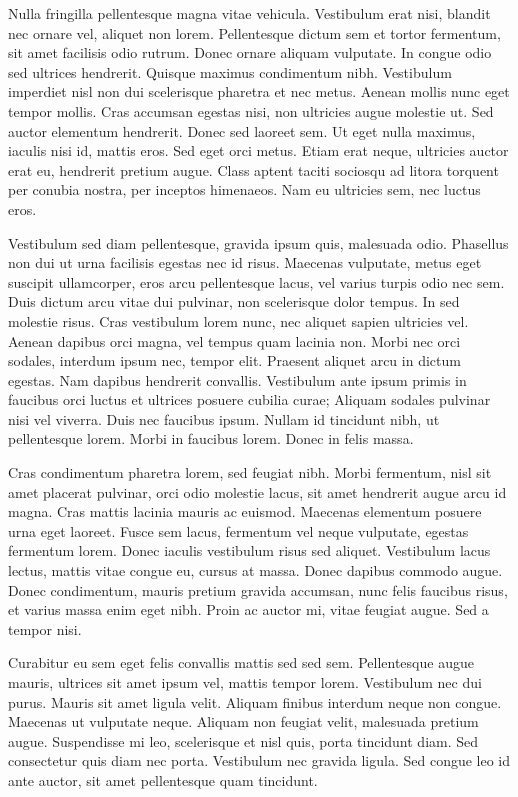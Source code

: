 \documentclass[11pt,twoside]{article}
\begin{document}
Nulla fringilla pellentesque magna vitae vehicula. Vestibulum erat nisi, blandit nec ornare vel, aliquet non lorem. Pellentesque dictum sem et tortor fermentum, sit amet facilisis odio rutrum. Donec ornare aliquam vulputate. In congue odio sed ultrices hendrerit. Quisque maximus condimentum nibh. Vestibulum imperdiet nisl non dui scelerisque pharetra et nec metus. Aenean mollis nunc eget tempor mollis. Cras accumsan egestas nisi, non ultricies augue molestie ut. Sed auctor elementum hendrerit. Donec sed laoreet sem. Ut eget nulla maximus, iaculis nisi id, mattis eros. Sed eget orci metus. Etiam erat neque, ultricies auctor erat eu, hendrerit pretium augue. Class aptent taciti sociosqu ad litora torquent per conubia nostra, per inceptos himenaeos. Nam eu ultricies sem, nec luctus eros.

Vestibulum sed diam pellentesque, gravida ipsum quis, malesuada odio. Phasellus non dui ut urna facilisis egestas nec id risus. Maecenas vulputate, metus eget suscipit ullamcorper, eros arcu pellentesque lacus, vel varius turpis odio nec sem. Duis dictum arcu vitae dui pulvinar, non scelerisque dolor tempus. In sed molestie risus. Cras vestibulum lorem nunc, nec aliquet sapien ultricies vel. Aenean dapibus orci magna, vel tempus quam lacinia non. Morbi nec orci sodales, interdum ipsum nec, tempor elit. Praesent aliquet arcu in dictum egestas. Nam dapibus hendrerit convallis. Vestibulum ante ipsum primis in faucibus orci luctus et ultrices posuere cubilia curae; Aliquam sodales pulvinar nisi vel viverra. Duis nec faucibus ipsum. Nullam id tincidunt nibh, ut pellentesque lorem. Morbi in faucibus lorem. Donec in felis massa.

Cras condimentum pharetra lorem, sed feugiat nibh. Morbi fermentum, nisl sit amet placerat pulvinar, orci odio molestie lacus, sit amet hendrerit augue arcu id magna. Cras mattis lacinia mauris ac euismod. Maecenas elementum posuere urna eget laoreet. Fusce sem lacus, fermentum vel neque vulputate, egestas fermentum lorem. Donec iaculis vestibulum risus sed aliquet. Vestibulum lacus lectus, mattis vitae congue eu, cursus at massa. Donec dapibus commodo augue. Donec condimentum, mauris pretium gravida accumsan, nunc felis faucibus risus, et varius massa enim eget nibh. Proin ac auctor mi, vitae feugiat augue. Sed a tempor nisi.

Curabitur eu sem eget felis convallis mattis sed sed sem. Pellentesque augue mauris, ultrices sit amet ipsum vel, mattis tempor lorem. Vestibulum nec dui purus. Mauris sit amet ligula velit. Aliquam finibus interdum neque non congue. Maecenas ut vulputate neque. Aliquam non feugiat velit, malesuada pretium augue. Suspendisse mi leo, scelerisque et nisl quis, porta tincidunt diam. Sed consectetur quis diam nec porta. Vestibulum nec gravida ligula. Sed congue leo id ante auctor, sit amet pellentesque quam tincidunt. 
\end{document}
